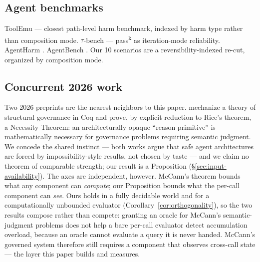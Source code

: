 \documentclass[11pt]{article}
\begin{document}
\subsection{Agent benchmarks}

ToolEmu \citep{ruan2024toolemu} --- closest path-level harm benchmark, indexed by harm type rather than composition mode. $\tau$-bench \citep{yao2024taubench} --- pass\textsuperscript{k} as iteration-mode reliability. AgentHarm \citep{andriushchenko2025agentharm}. AgentBench \citep{liu2024agentbench}. Our 10 scenarios are a reversibility-indexed re-cut, organized by composition mode.

\subsection{Concurrent 2026 work}
\label{sec:concurrent-2026}

Two 2026 preprints are the nearest neighbors to this paper. \citet{mccann2026governance} mechanize a theory of structural governance in Coq and prove, by explicit reduction to Rice's theorem, a Necessity Theorem: an architecturally opaque ``reason primitive'' is mathematically necessary for governance problems requiring semantic judgment. We concede the shared instinct --- both works argue that safe agent architectures are forced by impossibility-style results, not chosen by taste --- and we claim no theorem of comparable strength; our result is a Proposition (\S\ref{sec:input-availability}). The axes are independent, however. McCann's theorem bounds what any component can \emph{compute}; our Proposition bounds what the per-call component can \emph{see}. Ours holds in a fully decidable world and for a computationally unbounded evaluator (Corollary~\ref{cor:orthogonality}), so the two results compose rather than compete: granting an oracle for McCann's semantic-judgment problems does not help a bare per-call evaluator detect accumulation overload, because an oracle cannot evaluate a query it is never handed. McCann's governed system therefore still requires a component that observes cross-call state --- the layer this paper builds and measures.
\end{document}
